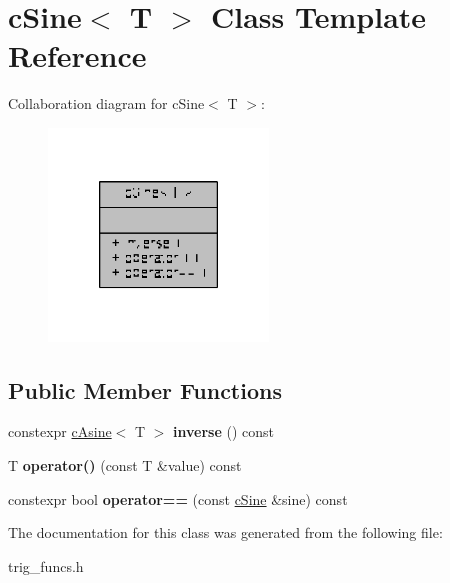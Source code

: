 \hypertarget{classcSine}{\section{c\-Sine$<$ T $>$ Class Template Reference}
\label{classcSine}
}


Collaboration diagram for c\-Sine$<$ T $>$\-:
\nopagebreak
\begin{figure}[H]
\begin{center}
\leavevmode
\includegraphics[width=166pt]{classcSine__coll__graph}
\end{center}
\end{figure}
\subsection*{Public Member Functions}
\begin{DoxyCompactItemize}
\item 
\hypertarget{classcSine_a19429291b35e204674444e1d6e5c2067}{constexpr \hyperlink{classcAsine}{c\-Asine}$<$ T $>$ {\bfseries inverse} () const }\label{classcSine_a19429291b35e204674444e1d6e5c2067}

\item 
\hypertarget{classcSine_ae9e58f1b0622c87b14043209e0f9b626}{T {\bfseries operator()} (const T \&value) const }\label{classcSine_ae9e58f1b0622c87b14043209e0f9b626}

\item 
\hypertarget{classcSine_a782ab06b55547dac3e29609692cb9df7}{constexpr bool {\bfseries operator==} (const \hyperlink{classcSine}{c\-Sine} \&sine) const }\label{classcSine_a782ab06b55547dac3e29609692cb9df7}

\end{DoxyCompactItemize}


The documentation for this class was generated from the following file\-:\begin{DoxyCompactItemize}
\item 
trig\-\_\-funcs.\-h\end{DoxyCompactItemize}

